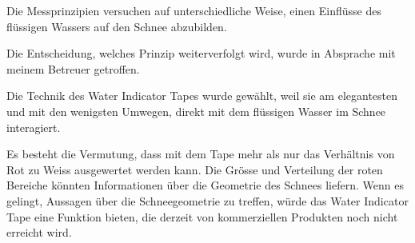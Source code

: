 Die Messprinzipien versuchen auf unterschiedliche Weise, einen Einflüsse des flüssigen Wassers auf den Schnee abzubilden.

Die Entscheidung, welches Prinzip weiterverfolgt wird, wurde in Absprache mit meinem Betreuer getroffen.

Die Technik des Water Indicator Tapes wurde gewählt, weil sie am elegantesten und mit den wenigsten Umwegen, direkt mit dem flüssigen Wasser im Schnee interagiert.


Es besteht die Vermutung, dass mit dem Tape mehr als nur das Verhältnis von Rot zu Weiss ausgewertet werden kann. Die Grösse und Verteilung der roten Bereiche könnten Informationen über die Geometrie des Schnees liefern. Wenn es gelingt, Aussagen über die Schneegeometrie zu treffen, würde das Water Indicator Tape eine Funktion bieten, die derzeit von kommerziellen Produkten noch nicht erreicht wird.
